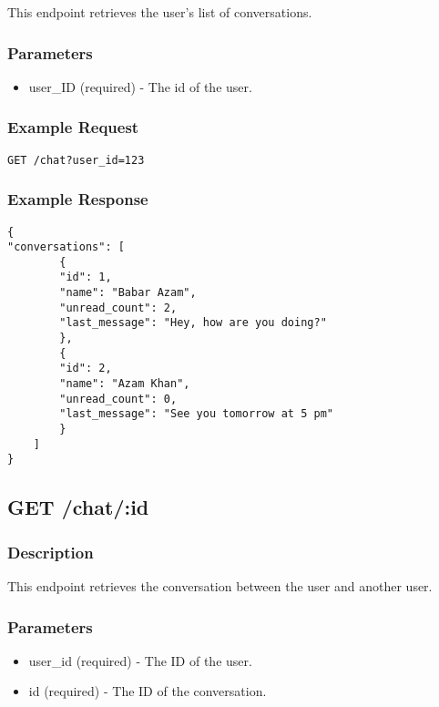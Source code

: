 \documentclass{article}
\begin{document}
This endpoint retrieves the user's list of conversations.

\subsubsection{Parameters}

\begin{itemize}
    \item user\_ID (required) - The id of the user.
\end{itemize}

\subsubsection{Example Request}

\begin{verbatim}
GET /chat?user_id=123
\end{verbatim}

\subsubsection{Example Response}

\begin{verbatim}
{
"conversations": [
        {
        "id": 1,
        "name": "Babar Azam",
        "unread_count": 2,
        "last_message": "Hey, how are you doing?"
        },
        {
        "id": 2,
        "name": "Azam Khan",
        "unread_count": 0,
        "last_message": "See you tomorrow at 5 pm"
        }
    ]
}
\end{verbatim}

\subsection{GET /chat/:id}

\subsubsection{Description}

This endpoint retrieves the conversation between the user and another user.

\subsubsection{Parameters}

\begin{itemize}
    \item user\_id (required) - The ID of the user.
    \item id (required) - The ID of the conversation.
\end{itemize}
\end{document}
